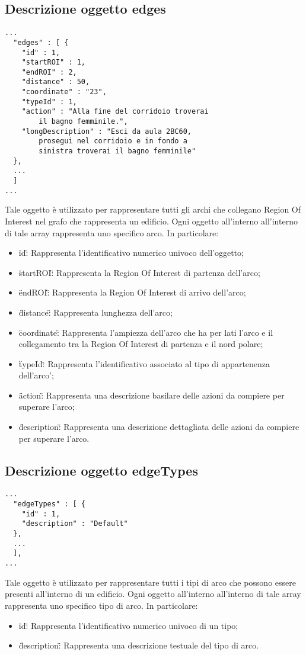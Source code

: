 \documentclass[../ManualeSviluppatore.tex]{subfiles}
\begin{document}
	\subsection{Descrizione oggetto edges}
		\begin{lstlisting}
...
  "edges" : [ {
    "id" : 1,
    "startROI" : 1,
    "endROI" : 2,
    "distance" : 50,
    "coordinate" : "23",
    "typeId" : 1,
    "action" : "Alla fine del corridoio troverai 
    	il bagno femminile.",
    "longDescription" : "Esci da aula 2BC60, 
    	prosegui nel corridoio e in fondo a 
    	sinistra troverai il bagno femminile"
  },
  ...
  ]
...
		\end{lstlisting}
		Tale oggetto è utilizzato per rappresentare tutti gli archi che collegano Region Of Interest nel grafo che rappresenta un edificio. Ogni oggetto all'interno all'interno di tale array rappresenta uno specifico arco. In particolare:
		\begin{itemize}
			\item \"id\": Rappresenta l'identificativo numerico univoco dell'oggetto;
			\item \"startROI\": Rappresenta la Region Of Interest di partenza dell'arco;
			\item \"endROI\": Rappresenta la Region Of Interest di arrivo dell'arco;
			\item \"distance\": Rappresenta lunghezza dell'arco;
			\item \"coordinate\": Rappresenta l'ampiezza dell'arco che ha per lati l'arco e il collegamento tra la Region Of Interest di partenza e il nord polare;
			\item \"typeId\": Rappresenta l'identificativo associato al tipo di appartenenza dell'arco';
			\item \"action\": Rappresenta una descrizione basilare delle azioni da compiere per superare l'arco;
			\item \"description\": Rappresenta una descrizione dettagliata delle azioni da compiere per superare l'arco.
		\end{itemize}
	\subsection{Descrizione oggetto edgeTypes}
		\begin{lstlisting}
...
  "edgeTypes" : [ {
    "id" : 1,
    "description" : "Default"
  }, 
  ...
  ],
...
		\end{lstlisting}
		Tale oggetto è utilizzato per rappresentare tutti i tipi di arco che possono essere presenti all'interno di un edificio. Ogni oggetto all'interno all'interno di tale array rappresenta uno specifico tipo di arco. In particolare:
		\begin{itemize}
			\item \"id\": Rappresenta l'identificativo numerico univoco di un tipo;
			\item \"description\": Rappresenta una descrizione testuale del tipo di arco.
		\end{itemize}
\end{document}
